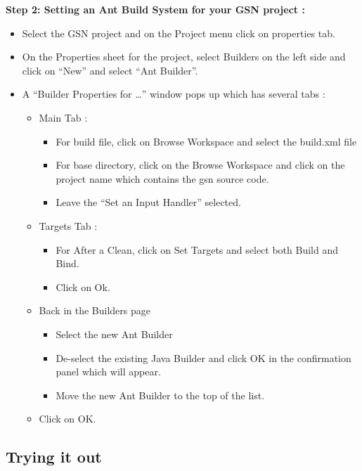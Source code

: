 \textbf{Step 2: Setting an Ant Build System for your GSN project :}

\begin{itemize}
	\item Select the GSN project and on the Project menu click on properties
tab.
	\item On the Properties sheet for the project, select Builders on the left
side and click on \textquotedblleft{}New\textquotedblright{} and select
\textquotedblleft{}Ant Builder\textquotedblright{}.
	\item A \textquotedblleft{}Builder Properties for
\ldots{}\textquotedblright{} window pops up which has several tabs :
\begin{itemize}
	\item Main Tab :
\begin{itemize}
	\item For build file, click on Browse Workspace and select the build.xml
file
	\item For base directory, click on the Browse Workspace and click on the
project name which contains the gsn source code.
	\item Leave the \textquotedblleft{}Set an Input Handler\textquotedblright{}
selected.
\end{itemize}

	\item Targets Tab :
\begin{itemize}
	\item For After a Clean, click on Set Targets and select both Build and
Bind.
	\item Click on Ok.
\end{itemize}

	\item Back in the Builders page
\begin{itemize}
	\item Select the new Ant Builder
	\item De-select the existing Java Builder and click OK in the confirmation
panel which will appear.
	\item Move the new Ant Builder to the top of the list.
\end{itemize}

	\item Click on OK.
\end{itemize}

\end{itemize}

\subsection{Trying it out}

